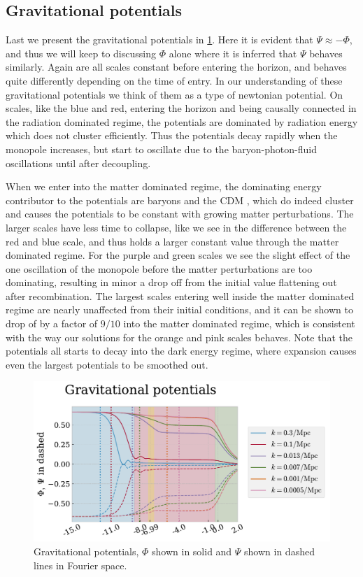 \documentclass[10pt,a4paper]{article}
\providecommand{\rCDM}
{\ensuremath{
\textrm{CDM}
}
}
\begin{document}
\subsection{Gravitational potentials}
\label{subsec:Results/Grav potentials}
Last we present the gravitational potentials in \cref{fig:Gravitational potentials}. Here it is evident that $\Psi \approx -\Phi$, and thus we will keep to discussing $\Phi$ alone where it is inferred that $\Psi$ behaves similarly. Again are all scales constant before entering the horizon, and behaves quite differently depending on the time of entry. In our understanding of these gravitational potentials we think of them as a type of newtonian potential. On scales, like the blue and red, entering the horizon and being causally connected in the radiation dominated regime, the potentials are dominated by radiation energy which does not cluster efficiently. Thus the potentials decay rapidly when the monopole increases, but start to oscillate due to the baryon-photon-fluid oscillations until after decoupling.

When we enter into the matter dominated regime, the dominating energy contributor to the potentials are baryons and the \rCDM, which do indeed cluster and causes the potentials to be constant with growing matter perturbations. The larger scales have less time to collapse, like we see in the difference between the red and blue scale, and thus holds a larger constant value through the matter dominated regime. For the purple and green scales we see the slight effect of the one oscillation of the monopole before the matter perturbations are too dominating, resulting in minor a drop off from the initial value flattening out after recombination. The largest scales entering well inside the matter dominated regime are nearly unaffected from their initial conditions, and it can be shown to drop of by a factor of $9/10$ into the matter dominated regime, which is consistent with the way our solutions for the orange and pink scales behaves. Note that the potentials all starts to decay into the dark energy regime, where expansion causes even the largest potentials to be smoothed out.

\begin{figure}[ht!]
  \centering
  \includegraphics[scale=0.5]{../figs/potential_pert.pdf}
  \caption{Gravitational potentials, $\Phi$ shown in solid and $\Psi$ shown in dashed lines in Fourier space.}
  \label{fig:Gravitational potentials}
\end{figure}




\end{document}
